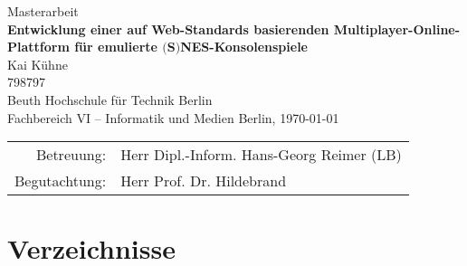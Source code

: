\documentclass[ngerman]{scrbook}
\newcommand{\myauthor}{Kai Kühne}  %
\newcommand{\mytitle}{Entwicklung einer auf Web-Standards basierenden Multiplayer-Online-Plattform für emulierte $($S$)$NES-Konsolenspiele}
\begin{document}
\frontmatter

\listoftodos[TODO]


\dedication{%
              Meinem Schnuckelchen\\
              in ewiger Liebe\\
              von Deinem Hasenboppelchen.}

\begin{titlepage}
\vspace*{\fill}
\begin{center}
\LARGE
Masterarbeit\\
\Large
\textbf{\mytitle}\\[1cm]
\large
\myauthor{}\\
798797\\[1cm]
Beuth Hochschule für Technik Berlin\\
Fachbereich VI -- Informatik und Medien
\vfill
\vfill
Berlin, \today
\normalsize
\vfill
\vfill
\begin{tabular}{rl}
Betreuung: & Herr Dipl.-Inform. Hans-Georg Reimer (LB)\\
Begutachtung: & Herr Prof. Dr. Hildebrand
\end{tabular}
\end{center}
\vspace*{\fill}
\end{titlepage}

\tableofcontents
\cleardoublepage

\mainmatter












\backmatter


\part{Verzeichnisse} %

\cleardoublepage
\listoffigures

\printbibheading[heading=bibnumbered,title={Literatur}]
\printbibliography[heading=subbibliography,title={Print},type=book]
\printbibliography[heading=subbibliography,title={Web},type=online]

\printindex

\glsaddall %
\printglossary[type=main,title=Glossar,toctitle=Glossar]
\printglossary[type=\acronymtype,title=Akronyme,toctitle=Akronyme]

\backmatter

\end{document}
